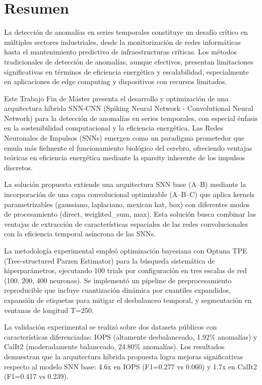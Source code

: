 \chapter*{Resumen}
\label{chap:resumen}


La detección de anomalías en series temporales constituye un desafío crítico en múltiples sectores industriales, desde la monitorización de redes informáticas hasta el mantenimiento predictivo de infraestructuras críticas. Los métodos tradicionales de detección de anomalías, aunque efectivos, presentan limitaciones significativas en términos de eficiencia energética y escalabilidad, especialmente en aplicaciones de edge computing y dispositivos con recursos limitados.

Este Trabajo Fin de Máster presenta el desarrollo y optimización de una arquitectura híbrida SNN-CNN (Spiking Neural Network - Convolutional Neural Network) para la detección de anomalías en series temporales, con especial énfasis en la sostenibilidad computacional y la eficiencia energética. Las Redes Neuronales de Impulsos (SNNs) emergen como un paradigma prometedor que emula más fielmente el funcionamiento biológico del cerebro, ofreciendo ventajas teóricas en eficiencia energética mediante la sparsity inherente de los impulsos discretos.

La solución propuesta extiende una arquitectura SNN base (A--B) mediante la incorporación de una capa convolucional optimizable (A--B--C) que aplica kernels parametrizables (gaussiano, laplaciano, mexican hat, box) con diferentes modos de procesamiento (direct, weighted\_sum, max). Esta solución busca combinar las ventajas de extracción de características espaciales de las redes convolucionales con la eficiencia temporal asíncrona de las SNNs.

La metodología experimental empleó optimización bayesiana con Optuna TPE (Tree-structured Parzen Estimator) para la búsqueda sistemática de hiperparámetros, ejecutando 100 trials por configuración en tres escalas de red (100, 200, 400 neuronas). Se implementó un pipeline de preprocesamiento reproducible que incluye cuantización dinámica por cuantiles expandidos, expansión de etiquetas para mitigar el desbalanceo temporal, y segmentación en ventanas de longitud T=250.

La validación experimental se realizó sobre dos datasets públicos con características diferenciadas: IOPS (altamente desbalanceado, 1.92\% anomalías) y CalIt2 (moderadamente balanceado, 24.80\% anomalías). Los resultados demuestran que la arquitectura híbrida propuesta logra mejoras significativas respecto al modelo SNN base: 4.6x en IOPS (F1=0.277 vs 0.060) y 1.7x en CalIt2 (F1=0.417 vs 0.239).

